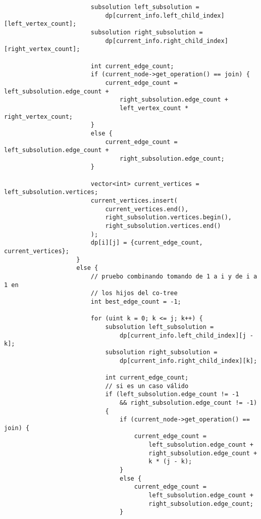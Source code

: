 \begin{lstlisting}
                        subsolution left_subsolution =
                            dp[current_info.left_child_index][left_vertex_count];
                        subsolution right_subsolution =
                            dp[current_info.right_child_index][right_vertex_count];

                        int current_edge_count;
                        if (current_node->get_operation() == join) {
                            current_edge_count = left_subsolution.edge_count +
                                right_subsolution.edge_count +
                                left_vertex_count * right_vertex_count;
                        }
                        else {
                            current_edge_count = left_subsolution.edge_count +
                                right_subsolution.edge_count;
                        }

                        vector<int> current_vertices = left_subsolution.vertices;
                        current_vertices.insert(
                            current_vertices.end(),
                            right_subsolution.vertices.begin(),
                            right_subsolution.vertices.end()
                        );
                        dp[i][j] = {current_edge_count, current_vertices};
                    }
                    else {
                        // pruebo combinando tomando de 1 a i y de i a 1 en
                        // los hijos del co-tree
                        int best_edge_count = -1;

                        for (uint k = 0; k <= j; k++) {
                            subsolution left_subsolution =
                                dp[current_info.left_child_index][j - k];
                            subsolution right_subsolution =
                                dp[current_info.right_child_index][k];

                            int current_edge_count;
                            // si es un caso válido
                            if (left_subsolution.edge_count != -1
                                && right_subsolution.edge_count != -1)
                            {
                                if (current_node->get_operation() == join) {
                                    current_edge_count =
                                        left_subsolution.edge_count +
                                        right_subsolution.edge_count +
                                        k * (j - k);
                                }
                                else {
                                    current_edge_count =
                                        left_subsolution.edge_count +
                                        right_subsolution.edge_count;
                                }


\end{lstlisting}
